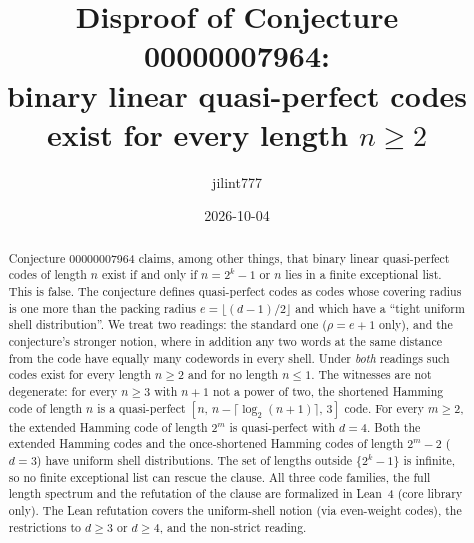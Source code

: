 \documentclass[11pt]{article}
\title{Disproof of Conjecture 00000007964:\\
binary linear quasi-perfect codes exist for every length $n\ge 2$}
\author{jilint777}
\date{2026-10-04}
\theoremstyle{definition}
\theoremstyle{remark}
\begin{document}
\sloppy
\maketitle

\begin{abstract}
Conjecture 00000007964 claims, among other things, that binary linear
quasi-perfect codes of length $n$ exist if and only if $n=2^k-1$ or $n$ lies
in a finite exceptional list. This is false. The conjecture defines
quasi-perfect codes as codes whose covering radius is one more than the packing
radius $e=\lfloor (d-1)/2\rfloor$ and which have a ``tight uniform shell
distribution''. We treat two readings: the standard one ($\rho=e+1$ only), and
the conjecture's stronger notion, where in addition any two words at the same
distance from the code have equally many codewords in every shell. Under
\emph{both} readings such codes exist for every length $n\ge 2$ and for no
length $n\le 1$. The witnesses are not degenerate:
for every $n\ge 3$ with $n+1$ not a power of two, the shortened Hamming code of
length $n$ is a quasi-perfect $[n,\,n-\lceil\log_2(n+1)\rceil,\,3]$ code. For
every $m\ge 2$, the extended Hamming code of length $2^m$ is quasi-perfect with
$d=4$. Both the extended Hamming codes and the once-shortened Hamming codes of
length $2^m-2$ ($d=3$) have uniform shell distributions. The set of lengths
outside $\{2^k-1\}$ is infinite, so no finite exceptional list can rescue the
clause. All three code families, the full length spectrum and the refutation
of the clause are formalized in Lean~4 (core library only). The Lean
refutation covers the uniform-shell notion (via even-weight codes), the
restrictions to $d\ge 3$ or $d\ge 4$, and the non-strict reading.
\end{abstract}
\end{document}
